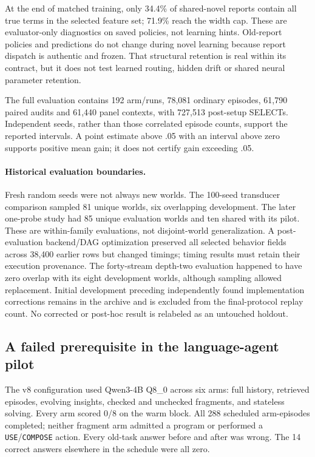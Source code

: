 \documentclass[10pt,twocolumn]{article}
\newcommand{\code}[1]{\texttt{\small #1}}
\begin{document}
At the end of matched training, only 34.4\% of shared-novel reports contain all
true terms in the selected feature set; 71.9\% reach the width cap. These are
evaluator-only diagnostics on saved policies, not learning hints. Old-report
policies and predictions do not change during novel learning because report
dispatch is authentic and frozen. That structural retention is real within its
contract, but it does not test learned routing, hidden drift or shared neural
parameter retention.

The full evaluation contains 192 arm/runs, 78,081 ordinary episodes, 61,790
paired audits and 61,440 panel contexts, with 727,513 post-setup SELECTs.
Independent seeds, rather than those correlated episode counts, support the
reported intervals. A point estimate above .05 with an interval above zero
supports positive mean gain; it does not certify gain exceeding .05.

\paragraph{Historical evaluation boundaries.}
Fresh random seeds were not always new worlds. The 100-seed transducer
comparison sampled 81 unique worlds, six overlapping development. The later
one-probe study had 85 unique evaluation worlds and ten shared with its pilot.
These are within-family evaluations, not disjoint-world generalization. A
post-evaluation backend/DAG optimization preserved all selected behavior fields
across 38,400 earlier rows but changed timings; timing results must retain their
execution provenance. The forty-stream depth-two evaluation happened to have
zero overlap with its eight development worlds, although sampling allowed
replacement. Initial development preceding independently found implementation
corrections remains in the archive and is excluded from the final-protocol
replay count. No corrected or post-hoc result is relabeled as an untouched
holdout.

\subsection{A failed prerequisite in the language-agent pilot}
The v8 configuration used Qwen3-4B Q8\_0 across six arms: full history, retrieved
episodes, evolving insights, checked and unchecked fragments, and stateless
solving. Every arm scored 0/8 on the warm block. All 288 scheduled arm-episodes
completed; neither fragment arm admitted a program or performed a
\code{USE}/\code{COMPOSE} action. Every old-task answer before and after was
wrong. The 14 correct answers elsewhere in the schedule were all zero.
\end{document}
